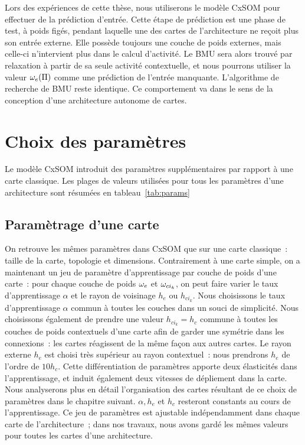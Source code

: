 \documentclass[../main]{subfiles}
\begin{document}
Lors des expériences de cette thèse, nous utiliserons le modèle CxSOM pour effectuer de la prédiction d'entrée. 
Cette étape de prédiction est une phase de test, à poids figés, pendant laquelle une des cartes de l'architecture ne reçoit plus son entrée externe. Elle possède toujours une couche de poids externes, mais celle-ci n'intervient plus dans le calcul d'activité.
Le BMU sera alors trouvé par relaxation à partir de sa seule activité contextuelle, et nous pourrons utiliser la valeur $\omega_e(\Pi)$ comme une prédiction de l'entrée manquante.
L'algorithme de recherche de BMU reste identique. Ce comportement va dans le sens de la conception d'une architecture autonome de cartes.

\section{Choix des paramètres}\label{sec:params}

Le modèle CxSOM introduit des paramètres supplémentaires par rapport à une carte classique. Les plages de valeurs utilisées pour tous les paramètres d'une architecture sont résumées en tableau~\ref{tab:params}

\subsection{Paramètrage d'une carte}
On retrouve les mêmes paramètres dans CxSOM que sur une carte classique~: taille de la carte, topologie et dimensions. 
Contrairement à une carte simple, on a maintenant un jeu de paramètre d'apprentissage par couche de poids d'une carte~: pour chaque couche de poids $\omega_e$ et $\omega_{ci_k}$, on peut faire varier le taux d'apprentissage $\alpha$ et le rayon de voisinage $h_e$ ou $h_{ci_k}$. 
Nous choisissons le taux d'apprentissage $\alpha$ commun à toutes les couches dans un souci de simplicité. 
Nous choisissons également de prendre une valeur $h_{ci_k} = h_c$ commune à toutes les couches de poids contextuels d'une carte afin de garder une symétrie dans les connexions~: les cartes réagissent de la même façon aux autres cartes.
Le rayon externe  $h_e$ est choisi très supérieur au rayon contextuel~: nous prendrons $h_e$ de l'ordre de $10 h_c$. Cette différentiation de paramètres apporte deux élasticités dans l'apprentissage, et induit également deux vitesses de dépliement dans la carte.
Nous analyserons plus en détail l'organisation des cartes résultant de ce choix de paramètres dans le chapitre suivant.
$\alpha, h_e$ et $h_c$ resteront constants au cours de l'apprentissage.
Ce jeu de paramètres est ajustable indépendamment dans chaque carte de l'architecture~; dans nos travaux, nous avons gardé les mêmes valeurs pour toutes les cartes d'une architecture.
\end{document}
